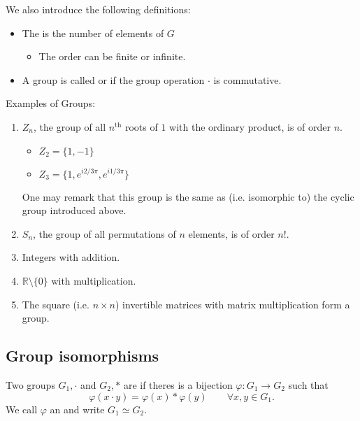 We also introduce the following definitions:

\begin{definition}
\begin{itemize}
\item The  is the number of elements of $G$
\begin{itemize}
\item The order can be finite or infinite.
\end{itemize}
\item A group is called  or  if the group operation $\boldsymbol{\cdot}$ is commutative.
\end{itemize}
\end{definition}

\begin{example}
Examples of Groups:
\begin{enumerate}
\item $Z_n$, the group of all $n^{\text{th}}$ roots of $1$ with the ordinary product, is of order $n$.
\begin{itemize}
\item $Z_2 = \{1,-1\}$
\item $Z_3 = \{1, e^{i2/3\pi}, e^{i1/3\pi}\}$
\end{itemize}
One may remark that this group is the same as (i.e. isomorphic to) the cyclic group introduced above.
\item $S_n$, the group of all permutations of $n$ elements, is of order $n!$.
\item Integers with addition.
\item $\mathbb{R}\setminus\{0\}$ with multiplication.
\item The square (i.e. $n\times n$) invertible matrices with matrix multiplication form a group.
\end{enumerate}
\end{example}

\subsection{Group isomorphisms}

\begin{definition}
Two groups $G_1, \cdot$ and $G_2,*$ are  if theres is a bijection $\varphi: G_1 \to G_2$ such that
\[ \varphi(x\cdot y) = \varphi(x)*\varphi(y) \qquad \forall x,y\in G_1.\]
We call $\varphi$ an  and write $G_1 \simeq G_2$.
\end{definition}


